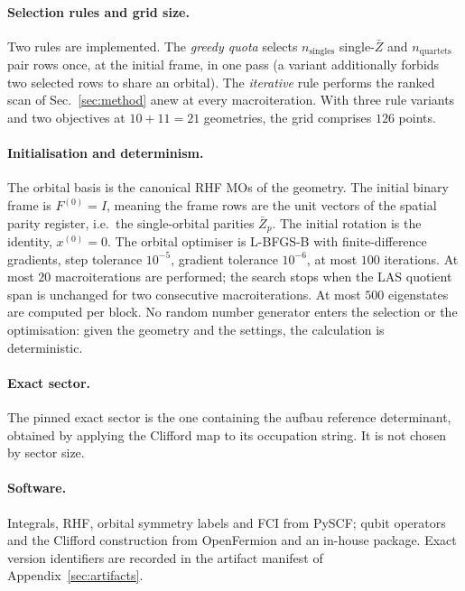 \documentclass[11pt]{article}
\newcommand{\Zb}{\bar Z}
\begin{document}
\paragraph{Selection rules and grid size.}
Two rules are implemented. The \emph{greedy quota} selects
$n_{\mathrm{singles}}$ single-$\Zb$ and $n_{\mathrm{quartets}}$ pair rows once,
at the initial frame, in one pass (a variant additionally forbids two selected
rows to share an orbital). The \emph{iterative} rule performs the ranked scan
of Sec.~\ref{sec:method} anew at every macroiteration. With three rule variants
and two objectives at $10+11=21$ geometries, the grid comprises $126$ points.

\paragraph{Initialisation and determinism.}
The orbital basis is the canonical RHF MOs of the geometry. The initial binary
frame is $F^{(0)}=I$, meaning the frame rows are the unit vectors of the
spatial parity register, i.e.\ the single-orbital parities $\Zb_p$. The initial
rotation is the identity, $x^{(0)}=0$. The orbital optimiser is L-BFGS-B with
finite-difference gradients, step tolerance $10^{-5}$, gradient tolerance
$10^{-6}$, at most $100$ iterations. At most $20$ macroiterations are performed;
the search stops when the LAS quotient span is unchanged for two consecutive
macroiterations. At most $500$ eigenstates are computed per block. No random
number generator enters the selection or the optimisation: given the geometry
and the settings, the calculation is deterministic.

\paragraph{Exact sector.}
The pinned exact sector is the one containing the aufbau reference determinant,
obtained by applying the Clifford map to its occupation string. It is not
chosen by sector size.

\paragraph{Software.}
Integrals, RHF, orbital symmetry labels and FCI from PySCF; qubit operators and
the Clifford construction from OpenFermion and an in-house package. Exact
version identifiers are recorded in the artifact manifest of
Appendix~\ref{sec:artifacts}.

\end{document}
